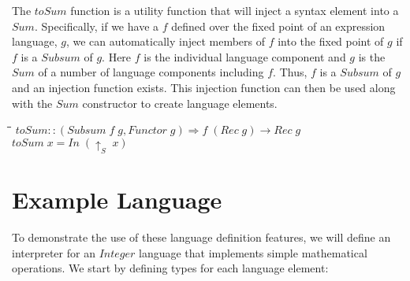 \documentclass[11pt]{article}
\newlength{\lwidth}\setlength{\lwidth}{4.5cm}
\newlength{\cwidth}\setlength{\cwidth}{8mm} %
\newcommand{\Conid}[1]{\mathit{#1}}
\newcommand{\Varid}[1]{\mathit{#1}}
\begin{document}
The \ensuremath{\Varid{toSum}} function is a utility function that will inject a syntax
element into a \ensuremath{\Conid{Sum}}.  Specifically, if we have a \ensuremath{\Varid{f}} defined over the
fixed point of an expression language, \ensuremath{\Varid{g}}, we can automatically
inject members of \ensuremath{\Varid{f}} into the fixed point of \ensuremath{\Varid{g}} if \ensuremath{\Varid{f}} is a \ensuremath{\Conid{Subsum}}
of \ensuremath{\Varid{g}}.  Here \ensuremath{\Varid{f}} is the individual language component and \ensuremath{\Varid{g}} is the
\ensuremath{\Conid{Sum}} of a number of language components including \ensuremath{\Varid{f}}.  Thus, \ensuremath{\Varid{f}} is
a \ensuremath{\Conid{Subsum}} of \ensuremath{\Varid{g}} and an injection function exists.  This injection
function can then be used along with the \ensuremath{\Conid{Sum}} constructor to create
language elements.

\begin{tabbing}
\qquad\=\hspace{\lwidth}\=\hspace{\cwidth}\=\+\kill
${\Varid{toSum}\mathbin{::}(\Conid{Subsum}\;\Varid{f}\;\Varid{g},\Conid{Functor}\;\Varid{g})\Rightarrow \Varid{f}\;(\Conid{Rec}\;\Varid{g})\to \Conid{Rec}\;\Varid{g}}$\\
${\Varid{toSum}\;\Varid{x}\mathrel{=}\Conid{In}\;(\Varid{\uparrow}_{S}\;\Varid{x})}$
\end{tabbing}
\section{Example Language}

To demonstrate the use of these language definition features, we will
define an interpreter for an \ensuremath{\Conid{Integer}} language that implements simple
mathematical operations.  We start by defining types for each language
element:
\end{document}
